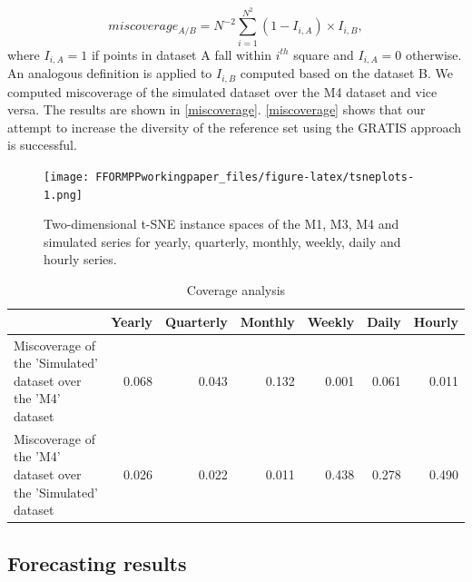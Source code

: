 \documentclass[11pt,a4paper,]{article}
\begin{document}
\[miscoverage_{A/B}=N^{-2}\sum_{i=1}^{N^2}(1-I_{i,A}) \times I_{i,B},\] where \(I_{i, A}= 1\) if points in dataset A fall within \(i^{th}\) square and \(I_{i, A}= 0\) otherwise. An analogous definition is applied to \(I_{i,B}\) computed based on the dataset B. We computed miscoverage of the simulated dataset over the M4 dataset and vice versa. The results are shown in \autoref{miscoverage}. \autoref{miscoverage} shows that our attempt to increase the diversity of the reference set using the GRATIS approach is successful.

\begin{figure}
\centering
\texttt{[image: FFORMPPworkingpaper\_files/figure-latex/tsneplots-1.png]}
\caption{\label{fig:tsneplots}Two-dimensional t-SNE instance spaces of the M1, M3, M4 and simulated series for yearly, quarterly, monthly, weekly, daily and hourly series.}
\end{figure}

\begin{table}[!h]
\caption{Coverage analysis}
\label{miscoverage}
\begin{tabular}{p{5cm}rrrrrr}
\hline
 & Yearly & Quarterly & Monthly & Weekly & Daily & Hourly \\ \hline
Miscoverage of the 'Simulated' dataset over the 'M4' dataset & 0.068 & 0.043 & 0.132 & 0.001 & 0.061 & 0.011\\ \hline
Miscoverage of the 'M4' dataset over the 'Simulated' dataset  & 0.026 & 0.022 & 0.011 & 0.438 & 0.278 & 0.490 \\ \hline
\end{tabular}
\end{table}

\hypertarget{forecasting-results}{%
\subsection{Forecasting results}\label{forecasting-results}}
\end{document}
